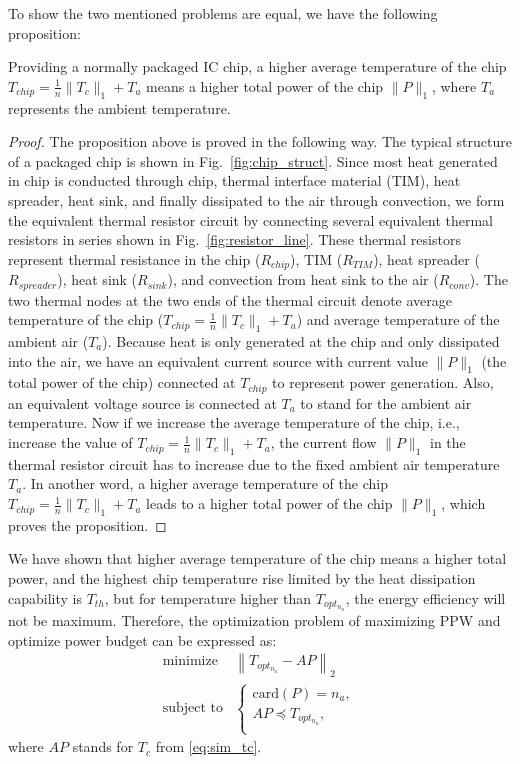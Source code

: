 To show the two mentioned problems are equal, we have the following
proposition: 
\begin{proposition}
Providing a normally packaged IC chip, a higher average temperature of
the chip $T_{chip} = \frac{1}{n}\|T_c\|_1 + T_{a}$ means a higher total power of the
chip $\|P\|_1$, where $T_{a}$ represents the ambient temperature.
\end{proposition}
\begin{proof}
The proposition above is proved in the following way. The typical structure
of a packaged chip is shown in Fig.~\ref{fig:chip_struct}. Since most heat generated in chip is
conducted through chip, thermal interface material (TIM), heat spreader,
heat sink, and finally dissipated to the air through convection, we
form the equivalent thermal resistor circuit by connecting several
equivalent thermal resistors in series shown in Fig.~\ref{fig:resistor_line}. These thermal resistors represent thermal
resistance in the chip ($R_{chip}$), TIM ($R_{TIM}$), heat spreader
($R_{spreader}$), heat sink ($R_{sink}$), and convection from heat
sink to the air ($R_{conv}$). The two thermal nodes at the two ends of
the thermal circuit denote average temperature of the chip
($T_{chip}=\frac{1}{n}\|T_c\|_1 + T_{a}$) and average temperature of the
ambient air ($T_{a}$). 
Because heat is only generated at the chip and only
dissipated into the air, we have an equivalent current source with
current value $\|P\|_1$ (the total power of the chip) connected
at $T_{chip}$ to represent power generation. Also, an equivalent voltage
source is connected at $T_{a}$ to stand for the ambient air
temperature. Now if we increase the average temperature of the chip,
i.e., increase the value of $T_{chip}=\frac{1}{n}\|T_c\|_1+T_{a}$, the current flow $\|P\|_1$ in the thermal
resistor circuit has to increase due to the fixed ambient air temperature
$T_{a}$. In another word, a higher average temperature of
the chip $T_{chip} = \frac{1}{n}\|T_c\|_1 + T_{a}$ leads to a higher total power of the
chip $\|P\|_1$, which proves the proposition.
\end{proof}

We have shown that higher average temperature of the chip means a higher
total power, and the highest
chip temperature rise limited by the heat dissipation capability is
$T_{th}$, but for temperature higher than $T_{opt_{n_{a}}}$, the energy efficiency will not be maximum. Therefore, the optimization problem of maximizing PPW and optimize power budget can be expressed as:
\begin{equation}\label{eq:sim_opt_topt}
\begin{split}
\text{minimize } &  \left \| T_{opt_{n_{a}}} - AP \right \|_{2}\\
\text{subject to} &\left\{
\begin{array}{lr}
\text{card}(P) = n_{a},\\
AP \preceq T_{opt_{n_{a}}},\\
\end{array}
\right.
\end{split}
\end{equation}
where $AP$ stands for $T_{c}$ from \eqref{eq:sim_tc}.


